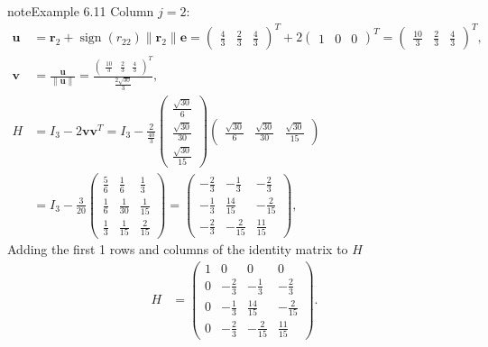 \documentclass[letterpaper,10pt,english]{jupyterBook}
\begin{document}
\begin{sphinxadmonition}{note}{Example 6.11}
\sphinxAtStartPar
Column \(j = 2\):
\begin{align*}
    \mathbf{u} &= \mathbf{r}_{2} + \operatorname{sign}(r_{22}) \| \mathbf{r}_{2} \| \mathbf{e} = \left(\begin{matrix}\frac{4}{3} & \frac{2}{3} & \frac{4}{3}\end{matrix}\right)^T + 2 \left(\begin{matrix}1 & 0 & 0\end{matrix}\right)^T = \left(\begin{matrix}\frac{10}{3} & \frac{2}{3} & \frac{4}{3}\end{matrix}\right)^T, \\
    \mathbf{v} &= \frac{\mathbf{u}}{\| \mathbf{u} \|} = \frac{\left(\begin{matrix}\frac{10}{3} & \frac{2}{3} & \frac{4}{3}\end{matrix}\right)^T}{\frac{2 \sqrt{30}}{3}}, \\
    H &= I_3 - 2\mathbf{vv}^T = I_3 - \frac{2}{\frac{40}{3}}\left(\begin{matrix}\frac{\sqrt{30}}{6}\\\frac{\sqrt{30}}{30}\\\frac{\sqrt{30}}{15}\end{matrix}\right)\left(\begin{matrix}\frac{\sqrt{30}}{6} & \frac{\sqrt{30}}{30} & \frac{\sqrt{30}}{15}\end{matrix}\right) \\
      &= I_3 - \frac{3}{20}\left(\begin{matrix}\frac{5}{6} & \frac{1}{6} & \frac{1}{3}\\\frac{1}{6} & \frac{1}{30} & \frac{1}{15}\\\frac{1}{3} & \frac{1}{15} & \frac{2}{15}\end{matrix}\right) = \left(\begin{matrix}- \frac{2}{3} & - \frac{1}{3} & - \frac{2}{3}\\- \frac{1}{3} & \frac{14}{15} & - \frac{2}{15}\\- \frac{2}{3} & - \frac{2}{15} & \frac{11}{15}\end{matrix}\right),
\end{align*}
\sphinxAtStartPar
Adding the first 1 rows and columns of the identity matrix to \(H\)
\begin{align*}
    H &= \left(\begin{matrix}1 & 0 & 0 & 0\\0 & - \frac{2}{3} & - \frac{1}{3} & - \frac{2}{3}\\0 & - \frac{1}{3} & \frac{14}{15} & - \frac{2}{15}\\0 & - \frac{2}{3} & - \frac{2}{15} & \frac{11}{15}\end{matrix}\right).

\end{align*}
\end{sphinxadmonition}
\end{document}
